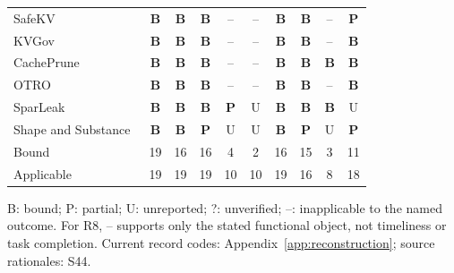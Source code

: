 \begin{table}[t]
\begin{tabularx}{\columnwidth}{@{}Y*{9}{c}@{}}
SafeKV~\cite{chu2025safekv} & \textbf{B} & \textbf{B} & \textbf{B} & -- & -- & \textbf{B} & \textbf{B} & -- & \textbf{P}\\
KVGov~\cite{addagada2026kvgov} & \textbf{B} & \textbf{B} & \textbf{B} & -- & -- & \textbf{B} & \textbf{B} & -- & \textbf{B}\\
CachePrune~\cite{wu2026cacheprune} & \textbf{B} & \textbf{B} & \textbf{B} & -- & -- & \textbf{B} & \textbf{B} & \textbf{B} & \textbf{B}\\
OTRO~\cite{lee2026otro} & \textbf{B} & \textbf{B} & \textbf{B} & -- & -- & \textbf{B} & \textbf{B} & -- & \textbf{B}\\
SparLeak~\cite{chen2026sparleak} & \textbf{B} & \textbf{B} & \textbf{B} & \textbf{P} & U & \textbf{B} & \textbf{B} & \textbf{B} & U\\
Shape and Substance~\cite{hadad2026shape} & \textbf{B} & \textbf{B} & \textbf{P} & U & U & \textbf{B} & \textbf{P} & U & \textbf{P}\\
\midrule Bound & 19 & 16 & 16 & 4 & 2 & 16 & 15 & 3 & 11\\
Applicable & 19 & 19 & 19 & 10 & 10 & 19 & 16 & 8 & 18\\
\bottomrule\end{tabularx}
\par\smallskip\raggedright B: bound; P: partial; U: unreported; ?: unverified; --: inapplicable to the named outcome. For R8, -- supports only the stated functional object, not timeliness or task completion. Current record codes: Appendix~\ref{app:reconstruction}; source rationales: S44.
\end{table}
